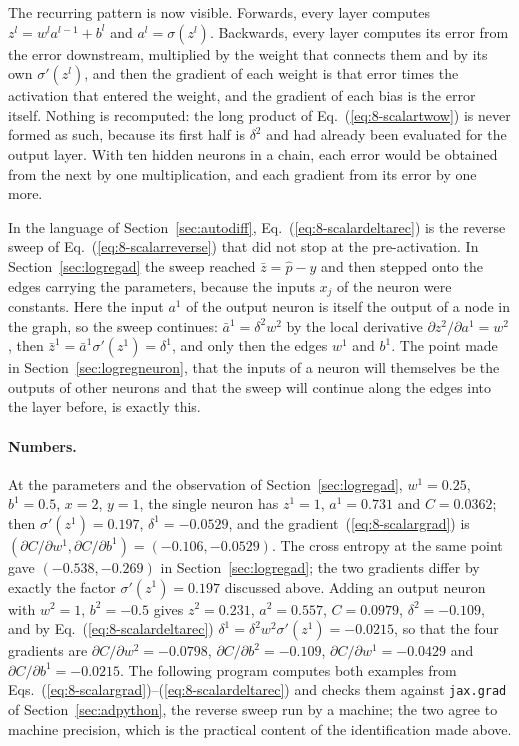 The recurring pattern is now visible.  Forwards, every layer computes
$z^{l}=w^{l}a^{l-1}+b^{l}$ and $a^{l}=\sigma(z^{l})$.  Backwards, every
layer computes its error from the error downstream, multiplied by the weight
that connects them and by its own $\sigma'(z^{l})$, and then the gradient of
each weight is that error times the activation that entered the weight, and
the gradient of each bias is the error itself.  Nothing is recomputed: the
long product of Eq.~(\ref{eq:8-scalartwow}) is never formed as such, because
its first half is $\delta^{2}$ and had already been evaluated for the output
layer.  With ten hidden neurons in a chain, each error would be obtained from
the next by one multiplication, and each gradient from its error by one more.

In the language of Section~\ref{sec:autodiff}, Eq.~(\ref{eq:8-scalardeltarec})
is the reverse sweep of Eq.~(\ref{eq:8-scalarreverse}) that did not stop at
the pre-activation.  In Section~\ref{sec:logregad} the sweep reached
$\bar z=\hat p-y$ and then stepped onto the edges carrying the parameters,
because the inputs $x_j$ of the neuron were constants.  Here the input $a^{1}$
of the output neuron is itself the output of a node in the graph, so the
sweep continues: $\bar a^{1}=\delta^{2}w^{2}$ by the local derivative
$\partial z^{2}/\partial a^{1}=w^{2}$, then $\bar z^{1}=\bar a^{1}\sigma'(z^{1})
=\delta^{1}$, and only then the edges $w^{1}$ and $b^{1}$.  The point made in
Section~\ref{sec:logregneuron}, that the inputs of a neuron will themselves be
the outputs of other neurons and that the sweep will continue along the edges
into the layer before, is exactly this.

\paragraph{Numbers.}
At the parameters and the observation of Section~\ref{sec:logregad},
$w^{1}=0.25$, $b^{1}=0.5$, $x=2$, $y=1$, the single neuron has $z^{1}=1$,
$a^{1}=0.731$ and $C=0.0362$; then $\sigma'(z^{1})=0.197$,
$\delta^{1}=-0.0529$, and the gradient~(\ref{eq:8-scalargrad}) is
$(\partial C/\partial w^{1},\partial C/\partial b^{1})=(-0.106,-0.0529)$.
The cross entropy at the same point gave $(-0.538,-0.269)$ in
Section~\ref{sec:logregad}; the two gradients differ by exactly the factor
$\sigma'(z^{1})=0.197$ discussed above.  Adding an output neuron with
$w^{2}=1$, $b^{2}=-0.5$ gives $z^{2}=0.231$, $a^{2}=0.557$, $C=0.0979$,
$\delta^{2}=-0.109$, and by Eq.~(\ref{eq:8-scalardeltarec})
$\delta^{1}=\delta^{2}w^{2}\sigma'(z^{1})=-0.0215$, so that the four
gradients are $\partial C/\partial w^{2}=-0.0798$,
$\partial C/\partial b^{2}=-0.109$, $\partial C/\partial w^{1}=-0.0429$ and
$\partial C/\partial b^{1}=-0.0215$.  The following program computes both
examples from Eqs.~(\ref{eq:8-scalargrad})--(\ref{eq:8-scalardeltarec}) and
checks them against \texttt{jax.grad} of Section~\ref{sec:adpython}, the
reverse sweep run by a machine; the two agree to machine precision, which is
the practical content of the identification made above.

